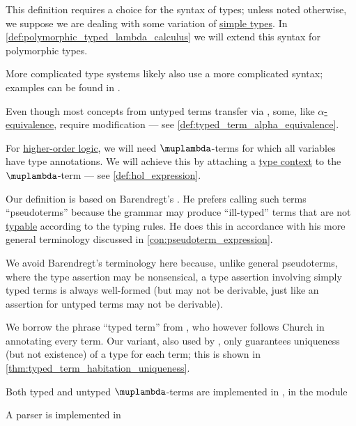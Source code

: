 \begin{comments}
  \item This definition requires a choice for the syntax of types; unless noted otherwise, we suppose we are dealing with some variation of \hyperref[def:simple_type]{simple types}. In \cref{def:polymorphic_typed_lambda_calculus} we will extend this syntax for polymorphic types.

  More complicated type systems likely also use a more complicated syntax; examples can be found in .

  \item Even though most concepts from untyped terms transfer via , some, like \hyperref[def:lambda_term_alpha_equivalence]{\( \alpha \)-equivalence}, require modification --- see \cref{def:typed_term_alpha_equivalence}.

  \item For \hyperref[def:higher_order_logic]{higher-order logic}, we will need \( \muplambda \)-terms for which all variables have type annotations. We will achieve this by attaching a \hyperref[def:type_context]{type context} to the \( \muplambda \)-term --- see \cref{def:hol_expression}.

  \item Our definition is based on Barendregt's \cite[def. 3.2.1]{Barendregt1992LambdaCalculiWithTypes}. He prefers calling such terms \enquote{pseudoterms} because the grammar may produce \enquote{ill-typed} terms that are not \hyperref[def:typability]{typable} according to the typing rules. He does this in accordance with his more general terminology discussed in \cref{con:pseudoterm_expression}.

  We avoid Barendregt's terminology here because, unlike general pseudoterms, where the type assertion may be nonsensical, a type assertion involving simply typed terms is always well-formed (but may not be derivable, just like an assertion for untyped terms may not be derivable).

  We borrow the phrase \enquote{typed term} from \cite[ch. 5]{Hindley1997BasicSTT}, who however follows Church in annotating every term. Our variant, also used by \textcite[\S 4.1.3]{Mimram2020ProgramEqualsProof}, only guarantees uniqueness (but not existence) of a type for each term; this is shown in \cref{thm:typed_term_habitation_uniqueness}.

  \item Both typed and untyped \( \muplambda \)-terms are implemented in \cite{notebook:code}, in the module
  \begin{CodeRefDisplay}
  \end{CodeRefDisplay}

  A parser is implemented in
  \begin{CodeRefDisplay}
  \end{CodeRefDisplay}
\end{comments}

